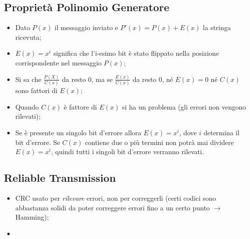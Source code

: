 \documentclass{article}
\begin{document}
    \subsection{Proprietà Polinomio Generatore}
      \begin{itemize}
        \item Dato $P(x)$ il messaggio inviato e $P'(x)=P(x)+E(x)$ la stringa ricevuta;
        \item $E(x)=x^i$ significa che l'i-esimo bit è stato flippato nella posizione corrispondente nel messaggio $P(x)$;
        \item Si sa che $\frac{P(X)}{C(x)}$ da resto $0$, ma se $\frac{E(x)}{C(x)}$ da resto 0, né $E(x)=0$ né $C(x)$ sono fattori di $E(x)$;
        \item Quando $C(x)$ è fattore di $E(x)$ si ha un problema (gli errori non vengono rilevati);
        \item Se è presente un singolo bit d'errore allora $E(x)=x^i$, dove $i$ determina il bit d'errore. Se $C(x)$ contiene due o più termini non potrà mai dividere $E(x)=x^i$, quindi tutti i singoli bit d'errore verranno rilevati. 
      \end{itemize}
    \subsection{Reliable Transmission}
      \begin{itemize}
        \item CRC usato per \textit{rilevare} errori, non per correggerli (certi codici sono abbastanza solidi da poter correggere errori fino a un certo punto $\rightarrow$ Hamming);
        \item 
      \end{itemize}
\end{document}
